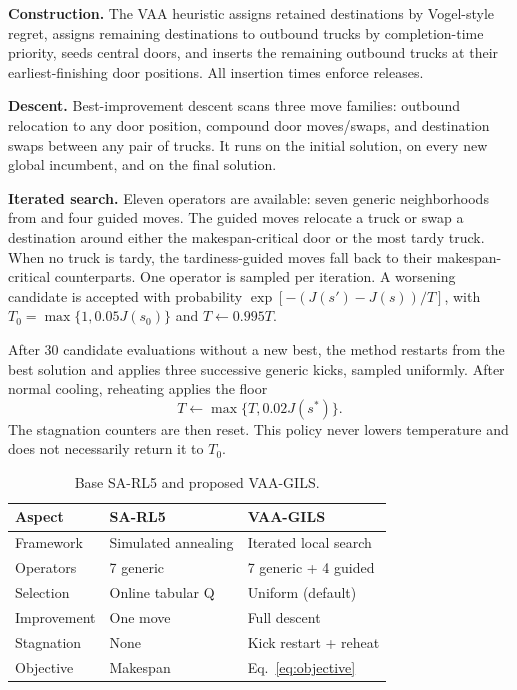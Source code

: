 \documentclass[11pt,a4paper]{article}
\begin{document}
\textbf{Construction.} The VAA heuristic assigns retained destinations by
Vogel-style regret, assigns remaining destinations to outbound trucks by
completion-time priority, seeds central doors, and inserts the remaining
outbound trucks at their earliest-finishing door positions. All insertion
times enforce releases.

\textbf{Descent.} Best-improvement descent scans three move families:
outbound relocation to any door position, compound door moves/swaps, and
destination swaps between any pair of trucks. It runs on the initial solution,
on every new global incumbent, and on the final solution.

\textbf{Iterated search.} Eleven operators are available: seven generic
neighborhoods from \cite{shahmardan2020} and four guided moves. The guided
moves relocate a truck or swap a destination around either the makespan-critical
door or the most tardy truck. When no truck is tardy, the tardiness-guided moves
fall back to their makespan-critical counterparts. One operator is sampled per
iteration. A worsening candidate is accepted with probability
$\exp[-(J(s')-J(s))/T]$, with
$T_0=\max\{1,0.05J(s_0)\}$ and $T\leftarrow0.995T$.

After 30 candidate evaluations without a new best, the method restarts from
the best solution and applies three successive generic kicks, sampled
uniformly. After normal cooling, reheating applies the floor
\begin{equation}
 T\leftarrow\max\{T,0.02J(s^*)\}. \label{eq:reheat}
\end{equation}
The stagnation counters are then reset. This policy never lowers temperature
and does not necessarily return it to $T_0$.

\begin{table}[t]
\centering
\caption{Base SA-RL5 and proposed VAA-GILS.}
\label{tab:method}
\small
\begin{tabularx}{\columnwidth}{@{}lXX@{}}
\toprule
Aspect & SA-RL5 & VAA-GILS \\
\midrule
Framework & Simulated annealing & Iterated local search \\
Operators & 7 generic & 7 generic + 4 guided \\
Selection & Online tabular Q & Uniform (default) \\
Improvement & One move & Full descent \\
Stagnation & None & Kick restart + reheat \\
Objective & Makespan & Eq.~\eqref{eq:objective} \\
\bottomrule
\end{tabularx}
\end{table}
\end{document}

